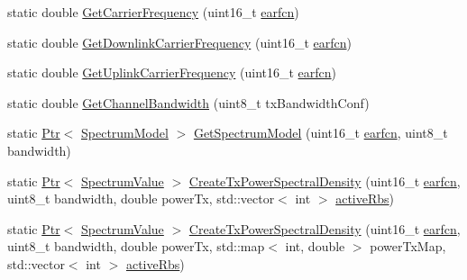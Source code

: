 \begin{DoxyCompactItemize}
\item 
static double \hyperlink{classns3_1_1LteSpectrumValueHelper_a07e5a6638c218927b61da7b75ae0b786}{Get\+Carrier\+Frequency} (uint16\+\_\+t \hyperlink{generate__test__data__lte__spectrum__value__txpsd_8m_a584be7562abb392609629331f8c6c42c}{earfcn})
\item 
static double \hyperlink{classns3_1_1LteSpectrumValueHelper_ac66d497f2d26a20d04b81deb37268f46}{Get\+Downlink\+Carrier\+Frequency} (uint16\+\_\+t \hyperlink{generate__test__data__lte__spectrum__value__txpsd_8m_a584be7562abb392609629331f8c6c42c}{earfcn})
\item 
static double \hyperlink{classns3_1_1LteSpectrumValueHelper_a68dacf6ed5c39f41e05e424561897a05}{Get\+Uplink\+Carrier\+Frequency} (uint16\+\_\+t \hyperlink{generate__test__data__lte__spectrum__value__txpsd_8m_a584be7562abb392609629331f8c6c42c}{earfcn})
\item 
static double \hyperlink{classns3_1_1LteSpectrumValueHelper_a95b49f604d55974b499714d0a6ca6513}{Get\+Channel\+Bandwidth} (uint8\+\_\+t tx\+Bandwidth\+Conf)
\item 
static \hyperlink{classns3_1_1Ptr}{Ptr}$<$ \hyperlink{classns3_1_1SpectrumModel}{Spectrum\+Model} $>$ \hyperlink{classns3_1_1LteSpectrumValueHelper_a8b8e37e31ac9bcf4e3fa2d69ad931e0e}{Get\+Spectrum\+Model} (uint16\+\_\+t \hyperlink{generate__test__data__lte__spectrum__value__txpsd_8m_a584be7562abb392609629331f8c6c42c}{earfcn}, uint8\+\_\+t bandwidth)
\item 
static \hyperlink{classns3_1_1Ptr}{Ptr}$<$ \hyperlink{classns3_1_1SpectrumValue}{Spectrum\+Value} $>$ \hyperlink{classns3_1_1LteSpectrumValueHelper_a3a6f8d1d197709d458882dfcf6005aa7}{Create\+Tx\+Power\+Spectral\+Density} (uint16\+\_\+t \hyperlink{generate__test__data__lte__spectrum__value__txpsd_8m_a584be7562abb392609629331f8c6c42c}{earfcn}, uint8\+\_\+t bandwidth, double power\+Tx, std\+::vector$<$ int $>$ \hyperlink{generate__test__data__lte__spectrum__value__txpsd_8m_a24a77723355dffcf07f2679649d46828}{active\+Rbs})
\item 
static \hyperlink{classns3_1_1Ptr}{Ptr}$<$ \hyperlink{classns3_1_1SpectrumValue}{Spectrum\+Value} $>$ \hyperlink{classns3_1_1LteSpectrumValueHelper_a80f622445631f64268ac0188e7e5a58a}{Create\+Tx\+Power\+Spectral\+Density} (uint16\+\_\+t \hyperlink{generate__test__data__lte__spectrum__value__txpsd_8m_a584be7562abb392609629331f8c6c42c}{earfcn}, uint8\+\_\+t bandwidth, double power\+Tx, std\+::map$<$ int, double $>$ power\+Tx\+Map, std\+::vector$<$ int $>$ \hyperlink{generate__test__data__lte__spectrum__value__txpsd_8m_a24a77723355dffcf07f2679649d46828}{active\+Rbs})

\end{DoxyCompactItemize}
